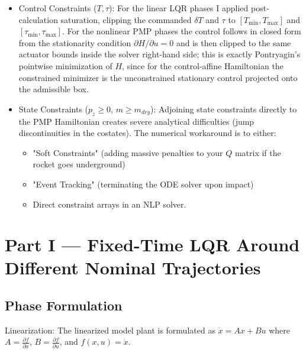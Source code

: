 \documentclass[letterpaper, 10 pt, conference]{ieeeconf}
\begin{document}
\begin{itemize}
    \item Control Constraints ($T, \tau$): For the linear LQR phases I applied post-calculation saturation, clipping the commanded $\delta T$ and $\tau$ to $[T_{\min},T_{\max}]$ and $[\tau_{\min},\tau_{\max}]$. For the nonlinear PMP phases the control follows in closed form from the stationarity condition $\partial H/\partial u = 0$ and is then clipped to the same actuator bounds inside the solver right-hand side; this is exactly Pontryagin's pointwise minimization of $H$, since for the control-affine Hamiltonian the constrained minimizer is the unconstrained stationary control projected onto the admissible box.
    \item State Constraints ($p_z \ge 0$, $m \ge m_{dry}$): Adjoining state constraints directly to the PMP Hamiltonian creates severe analytical difficulties (jump discontinuities in the costates). The numerical workaround is to either:
    \begin{itemize}
        \item "Soft Constraints" (adding massive penalties to your $Q$ matrix if the rocket goes underground)
        \item "Event Tracking" (terminating the ODE solver upon impact)
        \item Direct constraint arrays in an NLP solver.
    \end{itemize}
\end{itemize}


\newpage
\section{Part I — Fixed-Time LQR Around Different Nominal Trajectories}

\subsection{Phase Formulation}

Linearization: The linearized model plant is formulated as $\dot{x}=Ax+Bu$ where $A = \frac{\partial f}{\partial x}$, $B = \frac{\partial f}{\partial u}$, and $f(x,u) = \dot{x}$.
\end{document}
